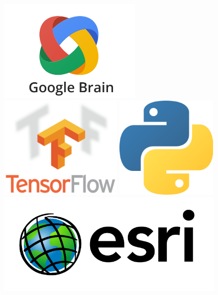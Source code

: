 \documentclass[22pt]{beamer}
\begin{document}
\begin{frame}[fragile]
\begin{textblock}{3.5}
%

\begin{figure}[htbp]
\centering
\includegraphics[height=5cm]{googlebrain-logo.png}
\hspace{1cm}
\includegraphics[height=5cm]{tensorflow-logo.png}
\hspace{1cm}
\includegraphics[height=5cm]{python-logo.png}
\hspace{1cm}
\includegraphics[height=5cm]{esri-logo.png}
\end{figure}


\end{textblock}
\end{frame}
\end{document}
